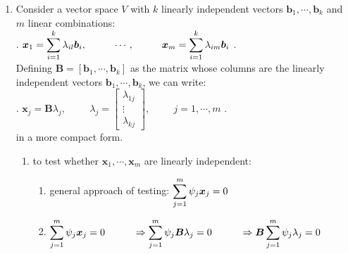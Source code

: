 \begin{enumerate}
    \item Consider a vector space $V$ with $k$ linearly independent vectors $\bm{b}_1, \cdots , \bm{b}_k$ and $m$ linear combinations:
    \hfill \cite{mfml/book/mml/Deisenroth-Faisal-Ong}
    \\
    .\hfill
    $
        \bm{x}_1 
        = \displaystyle\sum_{i=1}^k \lambda_{il} \bm{b}_i,
        \hspace{1cm}
        \cdots,
        \hspace{1cm}
        \bm{x}_m = \displaystyle\sum_{i=1}^k \lambda_{im} \bm{b}_i
    $
    \hfill.
    \hfill \cite{mfml/book/mml/Deisenroth-Faisal-Ong}
    \\
    \vspace{0.2cm}
    Defining $\bm{B} = [\bm{b}_1, \cdots , \bm{b}_k]$ as the matrix whose columns are the linearly independent vectors $\bm{b}_1, \cdots , \bm{b}_k$, we can write:
    \hfill \cite{mfml/book/mml/Deisenroth-Faisal-Ong}
    \\
    .\hfill
    $
        \bm{x}_j = \bm{B}\lambda_j, 
        \hspace{1cm}
        \lambda_j = \begin{bmatrix}\lambda_{1j} \\ \vdots \\ \lambda_{kj}\end{bmatrix},
        \hspace{1cm}
        j=1,\cdots,m
    $
    \hfill.
    \hfill \cite{mfml/book/mml/Deisenroth-Faisal-Ong}
    \\
    in a more compact form.
    \hfill \cite{mfml/book/mml/Deisenroth-Faisal-Ong}

    \begin{enumerate}
        \item to test whether $\bm{x}_1, \cdots , \bm{x}_m$ are linearly independent:
        \hfill \cite{mfml/book/mml/Deisenroth-Faisal-Ong}
        \begin{enumerate}
            \item general approach of testing: $\displaystyle\sum^m_{j=1} \psi_j \bm{x}_j = 0$
            \hfill \cite{mfml/book/mml/Deisenroth-Faisal-Ong}

            \item $
                    \displaystyle\sum^m_{j=1} \psi_j \bm{x}_j = 0
                    \hspace{1cm}
                    \Rightarrow \displaystyle\sum^m_{j=1} \psi_j \bm{B} \lambda_j = 0
                    \hspace{1cm}
                    \Rightarrow \bm{B} \displaystyle\sum^m_{j=1} \psi_j \lambda_j = 0
            $
            \hfill \cite{mfml/book/mml/Deisenroth-Faisal-Ong}


\end{enumerate}
\end{enumerate}
\end{enumerate}
